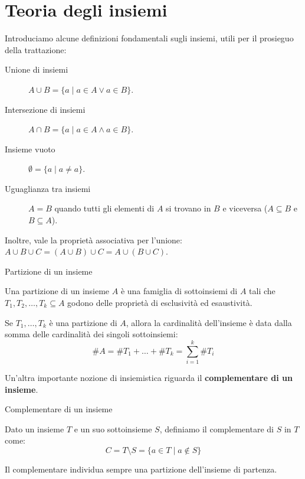 \documentclass[12pt]{report}
\begin{document}
	
	
	\chapter{Teoria degli insiemi}
	
	Introduciamo alcune definizioni fondamentali sugli insiemi, utili per il prosieguo della trattazione:
	\begin{description}
		
		\item [Unione di insiemi] $A \cup B = \{a \mid a \in A \lor a \in B\}$.
		
		\item [Intersezione di insiemi] $A \cap B = \{a \mid a \in A \land a \in B\}$.
		
		\item [Insieme vuoto] $\emptyset = \{a \mid a \neq a\}$.
		
		\item [Uguaglianza tra insiemi] $A = B$ quando tutti gli elementi di $A$ si trovano in $B$ e viceversa ($A \subseteq B$ e $B \subseteq A$).
		
	\end{description}
	Inoltre, vale la proprietà associativa per l'unione: $A \cup B \cup C = (A \cup B) \cup C = A \cup (B \cup C)$.
	
	\begin{definizione}{Partizione di un insieme}{}
		
		Una partizione di un insieme $A$ è una famiglia di sottoinsiemi di $A$ tali che $T_1, T_2, \dots, T_k \subseteq A$ godono delle proprietà di esclusività ed esaustività.
		
	\end{definizione}
	
	\begin{proposizione}{}{}
		
		Se $T_1, \dots, T_k$ è una partizione di $A$, allora la cardinalità dell'insieme è data dalla somma delle cardinalità dei singoli sottoinsiemi:
		\[
		\#A = \#T_1 + \dots + \#T_k = \sum_{i=1}^{k} \#T_i
		\]
		
	\end{proposizione}
	
	Un'altra importante nozione di insiemistica riguarda il \textbf{complementare di un insieme}. 
	
	\begin{definizione}{Complementare di un insieme}{}
		
		Dato un insieme $T$ e un suo sottoinsieme $S$, definiamo il complementare di $S$ in $T$ come:
		\[
		C = T \setminus S = \{a \in T \mid a \notin S\}
		\]
		
	\end{definizione}
	Il complementare individua sempre una partizione dell'insieme di partenza.
	
\end{document}
